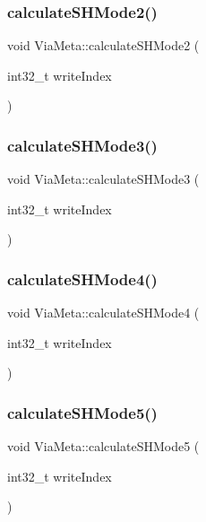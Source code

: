 \subsubsection{\texorpdfstring{calculate\+S\+H\+Mode2()}{calculateSHMode2()}}
{\footnotesize\ttfamily void Via\+Meta\+::calculate\+S\+H\+Mode2 (\begin{DoxyParamCaption}\item[{int32\+\_\+t}]{write\+Index }\end{DoxyParamCaption})}

\mbox{\label{class_via_meta_a1efd5183b450d406c611efe6685db2bb}} 
\subsubsection{\texorpdfstring{calculate\+S\+H\+Mode3()}{calculateSHMode3()}}
{\footnotesize\ttfamily void Via\+Meta\+::calculate\+S\+H\+Mode3 (\begin{DoxyParamCaption}\item[{int32\+\_\+t}]{write\+Index }\end{DoxyParamCaption})}

\mbox{\label{class_via_meta_a3d42b57263e2d3b81c0f53df54f61eac}} 
\subsubsection{\texorpdfstring{calculate\+S\+H\+Mode4()}{calculateSHMode4()}}
{\footnotesize\ttfamily void Via\+Meta\+::calculate\+S\+H\+Mode4 (\begin{DoxyParamCaption}\item[{int32\+\_\+t}]{write\+Index }\end{DoxyParamCaption})}

\mbox{\label{class_via_meta_a8f6cdf15395d9382bd085b14a1207b43}} 
\subsubsection{\texorpdfstring{calculate\+S\+H\+Mode5()}{calculateSHMode5()}}
{\footnotesize\ttfamily void Via\+Meta\+::calculate\+S\+H\+Mode5 (\begin{DoxyParamCaption}\item[{int32\+\_\+t}]{write\+Index }\end{DoxyParamCaption})}


